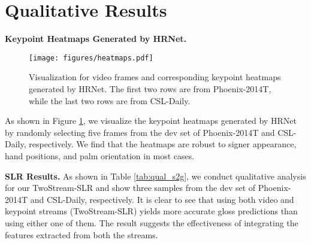 \documentclass{article}
\begin{document}
\section{Qualitative Results}
\textbf{Keypoint Heatmaps Generated by HRNet.}
\begin{figure}[t]
\centering
\texttt{[image: figures/heatmaps.pdf]}
\caption{Visualization for video frames and corresponding keypoint heatmaps generated by HRNet. The first two rows are from Phoenix-2014T, while the last two rows are from CSL-Daily.}
\label{fig:heatmap}
\end{figure}
As shown in Figure \ref{fig:heatmap}, we visualize the keypoint heatmaps generated by HRNet by randomly selecting five frames from the dev set of Phoenix-2014T and CSL-Daily, respectively. 
We find that the heatmaps are robust to signer appearance, hand positions, and palm orientation in most cases. 


\textbf{SLR Results.} As shown in Table \ref{tab:qual_s2g}, we conduct qualitative analysis for our TwoStream-SLR and show three samples from the dev set of Phoenix-2014T and CSL-Daily, respectively.
It is clear to see that using both video and keypoint streams (TwoStream-SLR) yields more accurate gloss predictions than using either one of them. The result suggests the effectiveness of integrating the features extracted from both the streams.
\end{document}
